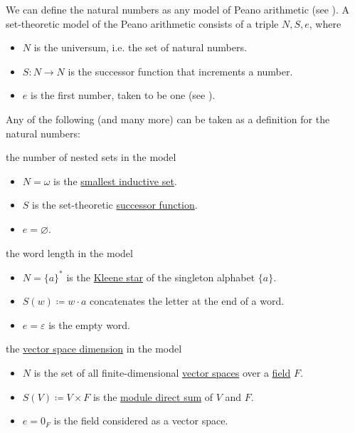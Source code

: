 \begin{definition}\label{def:peano_arithmetic_models}
  We can define the natural numbers as any model of Peano arithmetic (see ). A set-theoretic model of the Peano arithmetic consists of a triple \( N, S, e \), where
  \begin{itemize}
    \item \( N \) is the universum, i.e. the set of natural numbers.
    \item \( S: N \to N \) is the successor function that increments a number.
    \item \( e \) is the first number, taken to be one (see ).
  \end{itemize}

  Any of the following (and many more) can be taken as a definition for the natural numbers:
  \begin{DefEnum}
     the number of nested sets in the model
    \begin{itemize}
      \item \( N = \omega \) is the \hyperref[def:smallest_inductive_set]{smallest inductive set}.
      \item \( S \) is the set-theoretic \hyperref[def:successor_operator]{successor function}.
      \item \( e = \varnothing \).
    \end{itemize}

     the word length in the model
    \begin{itemize}
      \item \( N = \{ a \}^{*} \) is the \hyperref[def:language]{Kleene star} of the singleton alphabet \( \{ a \} \).
      \item \( S(w) \coloneqq w \cdot a \) concatenates the letter at the end of a word.
      \item \( e = \varepsilon \) is the empty word.
    \end{itemize}

     the \hyperref[def:vector_space_dimension]{vector space dimension} in the model
    \begin{itemize}
      \item \( N \) is the set of all finite-dimensional \hyperref[def:vector_space]{vector spaces} over a \hyperref[def:semiring/field]{field} \( F \).
      \item \( S(V) \coloneqq V \times F \) is the \hyperref[def:left_module_direct_product]{module direct sum} of \( V \) and \( F \).
      \item \( e = 0_F \) is the field considered as a vector space.
    \end{itemize}
  \end{DefEnum}
\end{definition}

